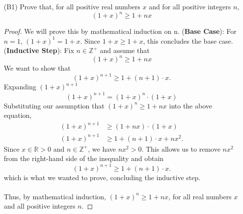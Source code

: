 \documentclass{article}
\begin{document}
    \begin{itemize}

    	\item [(B1)] Prove that, for all positive real numbers $x$ and for all positive integers $n$,
    		\[
    			\left( 1 + x \right)^n \ge 1 + nx
    		\]
                \begin{proof}
                    We will prove this by mathematical induction on n.
                    \ppar (\textbf{Base Case}): For $n = 1$, $(1 + x)^1 = 1 + x$. Since $1 + x \ge 1 + x$, this concludes the base case.
                    \ppar (\textbf{Inductive Step}): Fix $n\in\mathbb{Z}^+$ and assume that 
                        \[
    			             \left( 1 + x \right)^n \ge 1 + nx
    		          \]
                    \ppar We want to show that
                        \[
    			             \left( 1 + x \right)^{n + 1} \ge 1 + (n + 1)\cdot x.
    		          \]
                    \ppar Expanding $\left( 1 + x \right)^{n + 1}$
                        \[
    			             \left( 1 + x \right)^{n + 1} = (1 + x)^n \cdot (1 + x)
    		          \]
                    \ppar Substituting our assumption that $\left( 1 + x \right)^n \ge 1 + nx$ into the above equation,
                        \begin{align*}
                            \left( 1 + x \right)^{n + 1} &\ge (1 + nx)\cdot (1 + x) \\ 
                            \left( 1 + x \right)^{n + 1} &\ge 1 + (n + 1)\cdot x + nx^2.
                        \end{align*}
                    \ppar Since $x\in\mathbb{R} > 0$ and $n\in\mathbb{Z}^+$, we have $nx^2 > 0$. This allows us to remove $nx^2$ from the right-hand side of the inequality and obtain
                        \[
    			        \left( 1 + x \right)^{n + 1} \ge 1 + (n + 1)\cdot x.
    		          \]
                    which is what we wanted to prove, concluding the inductive step.
                    \\\\ Thus, by mathematical induction, $\left( 1 + x \right)^n \ge 1 + nx$, for all real numbers $x$ and all positive integers $n$.
                \end{proof}


\end{itemize}
\end{document}
